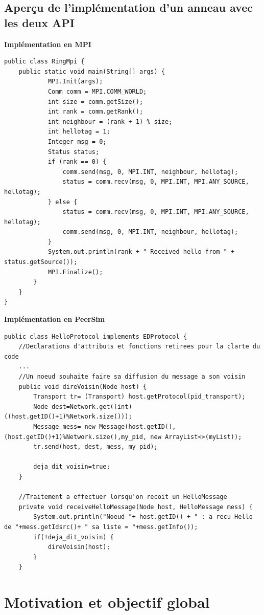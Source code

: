 \documentclass{article}
\begin{document}
			\subsection{Aperçu de l'implémentation d'un anneau avec les deux API}
				{\bfseries Implémentation en MPI}
				\begin{lstlisting}
public class RingMpi {
	public static void main(String[] args) {
			MPI.Init(args);
			Comm comm = MPI.COMM_WORLD;
			int size = comm.getSize();
			int rank = comm.getRank();
			int neighbour = (rank + 1) % size;
			int hellotag = 1;
			Integer msg = 0;
			Status status;
			if (rank == 0) {
				comm.send(msg, 0, MPI.INT, neighbour, hellotag);
				status = comm.recv(msg, 0, MPI.INT, MPI.ANY_SOURCE, hellotag);
			} else {
				status = comm.recv(msg, 0, MPI.INT, MPI.ANY_SOURCE, hellotag);
				comm.send(msg, 0, MPI.INT, neighbour, hellotag);
			}
			System.out.println(rank + " Received hello from " + status.getSource());
			MPI.Finalize();
		}
	}
}
				\end{lstlisting}
				{\bfseries Implémentation en PeerSim}
				\begin{lstlisting}
public class HelloProtocol implements EDProtocol {
	//Declarations d'attributs et fonctions retirees pour la clarte du code
	...
	//Un noeud souhaite faire sa diffusion du message a son voisin
	public void direVoisin(Node host) {
		Transport tr= (Transport) host.getProtocol(pid_transport);
		Node dest=Network.get((int) ((host.getID()+1)%Network.size()));
		Message mess= new Message(host.getID(),(host.getID()+1)%Network.size(),my_pid, new ArrayList<>(myList));
		tr.send(host, dest, mess, my_pid);

		deja_dit_voisin=true;
	}

	//Traitement a effectuer lorsqu'on recoit un HelloMessage
	private void receiveHelloMessage(Node host, HelloMessage mess) {
		System.out.println("Noeud "+ host.getID() + " : a recu Hello de "+mess.getIdsrc()+ " sa liste = "+mess.getInfo());
		if(!deja_dit_voisin) {
			direVoisin(host);
		}
	}
				\end{lstlisting}
		\section{Motivation et objectif global}
\end{document}
